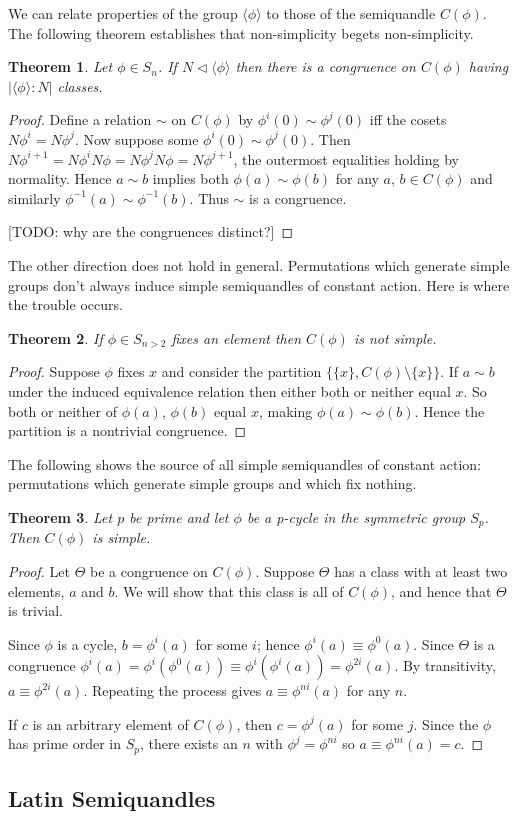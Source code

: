 \documentclass{amsart}
\newtheorem{thm}{Theorem}[section]
\theoremstyle{definition}
\numberwithin{equation}{section}
\begin{document}
We can relate properties of the group $\langle\phi\rangle$ to those of the semiquandle $C(\phi)$.
The following theorem establishes that non-simplicity begets non-simplicity.

\begin{thm}
Let $\phi \in S_n$. If $N \lhd \langle\phi\rangle$ then there is a congruence on
$C(\phi)$ having $\left|\langle\phi\rangle : N\right|$ classes.
\end{thm}
\begin{proof}
Define a relation $\sim$ on $C(\phi)$ by $\phi^{i}(0) \sim \phi^{j}(0)$ iff
the cosets $N\phi^{i} = N\phi^{j}$. Now suppose some $\phi^{i}(0) \sim \phi^{j}(0)$. Then
$N\phi^{i+1} = N\phi^{i}N\phi = N\phi^{j}N\phi = N\phi^{j+1}$, the outermost equalities holding
by normality. Hence $a \sim b$ implies both $\phi(a) \sim \phi(b)$ for any $a$, $b \in C(\phi)$
and similarly $\phi^{-1}(a) \sim \phi^{-1}(b)$. Thus $\sim$ is a congruence.

[TODO: why are the congruences distinct?]
\end{proof}

The other direction does not hold in general. Permutations which generate simple groups don't
always induce simple semiquandles of constant action. Here is where the trouble occurs.

\begin{thm}
If $\phi \in S_{n > 2}$ fixes an element then $C(\phi)$ is not simple.
\end{thm}
\begin{proof}
Suppose $\phi$ fixes $x$ and consider the partition $\{ \{x\}, C(\phi) \setminus \{x\} \}$.
If $a \sim b$ under the induced equivalence relation then either both or neither equal $x$.
So both or neither of $\phi(a)$, $\phi(b)$ equal $x$, making $\phi(a) \sim \phi(b)$.
Hence the partition is a nontrivial congruence.
\end{proof}

The following shows the source of all simple semiquandles of constant action: permutations
which generate simple groups and which fix nothing.

\begin{thm}
Let $p$ be prime and let $\phi$ be a p-cycle in the symmetric group $S_p$.
Then $C(\phi)$ is simple.
\end{thm}
\begin{proof}
Let $\Theta$ be a congruence on $C(\phi)$. Suppose $\Theta$ has a class with
at least two elements, $a$ and $b$. We will show that this class is all of
$C(\phi)$, and hence that $\Theta$ is trivial.

Since $\phi$ is a cycle, $b = \phi^{i}(a)$ for some $i$; hence
$\phi^{i}(a) \equiv \phi^{0}(a)$. Since $\Theta$ is a congruence $\phi^{i}(a) =
\phi^{i}(\phi^{0}(a)) \equiv \phi^{i}(\phi^{i}(a)) = \phi^{2i}(a)$. By transitivity,
$a \equiv \phi^{2i}(a)$. Repeating the process gives $a \equiv \phi^{ni}(a)$ for any $n$.

If $c$ is an arbitrary element of $C(\phi)$, then $c = \phi^{j}(a)$ for some $j$.
Since the $\phi$ has prime order in $S_p$, there exists an $n$ with
$\phi^{j} = \phi^{ni}$ so $a \equiv \phi^{ni}(a) = c$.
\end{proof}

\subsection{Latin Semiquandles}
\end{document}
